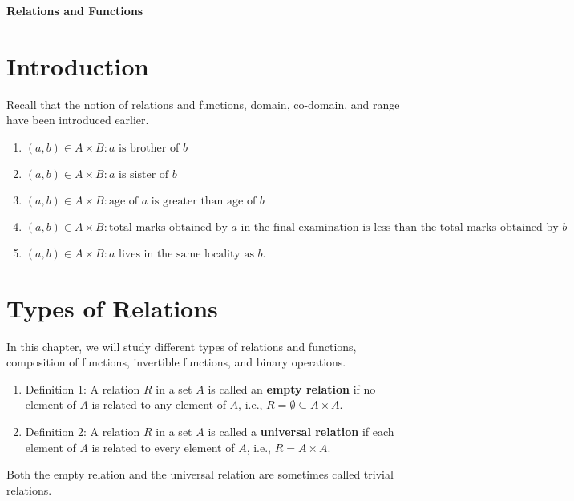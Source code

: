 \documentclass[11pt]{article}
\begin{document}
\begin{center}
    \Large \textbf{Relations and Functions}
\end{center}

\section{Introduction}
Recall that the notion of relations and functions, domain, co-domain, and range have been introduced earlier.

\begin{enumerate}
    \item ${(a, b) \in A \times B: a \text{ is brother of } b}$
    \item ${(a, b) \in A \times B: a \text{ is sister of } b}$
    \item ${(a, b) \in A \times B: \text{age of } a \text{ is greater than age of } b}$
    \item ${(a, b) \in A \times B: \text{total marks obtained by } a \text{ in the final examination is less than the total marks obtained by } b}$
    \item ${(a, b) \in A \times B: a \text{ lives in the same locality as } b}$.
\end{enumerate}

\section{Types of Relations}
In this chapter, we will study different types of relations and functions, composition of functions, invertible functions, and binary operations.

\begin{enumerate}
    \item Definition 1: A relation \( R \) in a set \( A \) is called an \textbf{empty relation} if no element of \( A \) is related to any element of \( A \), i.e., \( R = \emptyset \subseteq A \times A \).
    \item Definition 2: A relation \( R \) in a set \( A \) is called a \textbf{universal relation} if each element of \( A \) is related to every element of \( A \), i.e., \( R = A \times A \).
\end{enumerate}

Both the empty relation and the universal relation are sometimes called trivial relations.
\end{document}
